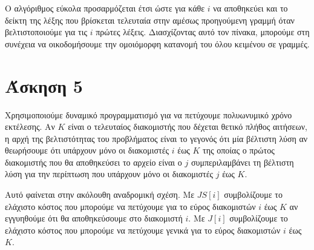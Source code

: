 \documentclass[11pt,a4paper]{book}
\begin{document}
Ο αλγόριθμος εύκολα προσαρμόζεται έτσι ώστε για κάθε $i$ να αποθηκεύει και το δείκτη της λέξης που βρίσκεται τελευταία στην αμέσως προηγούμενη γραμμή όταν βελτιστοποιούμε για τις $i$ πρώτες λέξεις. Διασχίζοντας αυτό τον πίνακα, μπορούμε στη συνέχεια να οικοδομήσουμε την ομοιόμορφη κατανομή του όλου κειμένου σε γραμμές.

\section*{Άσκηση 5}
Χρησιμοποιούμε δυναμικό προγραμματισμό για να πετύχουμε πολυωνυμικό χρόνο εκτέλεσης. Αν $K$ είναι ο τελευταίος διακομιστής που δέχεται θετικό πλήθος αιτήσεων, η αρχή της βελτιστότητας του προβλήματος είναι το γεγονός ότι μία βέλτιστη λύση αν θεωρήσουμε ότι υπάρχουν μόνο οι διακομιστές $i$ έως $K$ της οποίας ο πρώτος διακομιστής που θα αποθηκεύσει το αρχείο είναι ο $j$ συμπεριλαμβάνει τη βέλτιστη λύση για την περίπτωση που υπάρχουν μόνο οι διακομιστές $j$ έως $K$.

Αυτό φαίνεται στην ακόλουθη αναδρομική σχέση. Με $JS[ i ]$ συμβολίζουμε το ελάχιστο κόστος που μπορούμε να πετύχουμε για το εύρος διακομιστών $i$ έως $K$ αν εγγυηθούμε ότι θα αποθηκεύσουμε στο διακομιστή $i$. Με $J[ i ]$ συμβολίζουμε το ελάχιστο κόστος που μπορούμε να πετύχουμε γενικά για το εύρος διακομιστών $i$ έως $K$.
\end{document}
